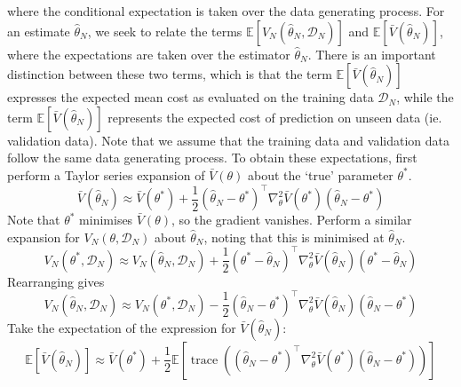 \documentclass[11pt]{report} %
\begin{document}
where the conditional expectation is taken over the data generating process. For an estimate $\hat{\theta}_{N}$, we seek to relate the terms $\mathbb{E}\left[V_{N}\left(\hat{\theta}_{N}, \mathcal{D}_{N}\right)\right]$ and $\mathbb{E}\left[\bar{V}\left(\hat{\theta}_{N}\right)\right]$, where the expectations are taken over the estimator $\hat{\theta}_{N}$. There is an important distinction between these two terms, which is that the term $\mathbb{E}\left[\bar{V}\left(\hat{\theta}_{N}\right)\right]$ expresses the expected mean cost as evaluated on the training data $\mathcal{D}_{N}$, while the term $\mathbb{E}\left[\bar{V}\left(\hat{\theta}_{N}\right)\right]$ represents the expected cost of prediction on unseen data (ie. validation data). Note that we assume that the training data and validation data follow the same data generating process. To obtain these expectations, first perform a Taylor series expansion of $\bar{V}\left(\theta\right)$ about the `true' parameter $\theta^{*}$.
\begin{equation}
\bar{V}\left(\hat{\theta}_{N}\right) \approx \bar{V}\left(\theta^{*}\right) + \dfrac{1}{2}\left(\hat{\theta}_{N} - \theta^{*}\right)^{\top}\nabla_{\theta}^{2}\bar{V}\left(\theta^{*}\right)\left(\hat{\theta}_{N} - \theta^{*}\right)
\end{equation}
Note that $\theta^{*}$ minimises $\bar{V}\left(\theta\right)$, so the gradient vanishes. Perform a similar expansion for $V_{N}\left(\theta, \mathcal{D}_{N}\right)$ about $\hat{\theta}_{N}$, noting that this is minimised at $\hat{\theta}_{N}$.
\begin{equation}
V_{N}\left(\theta^{*}, \mathcal{D}_{N}\right) \approx V_{N}\left(\hat{\theta}_{N}, \mathcal{D}_{N}\right) + \dfrac{1}{2}\left(\theta^{*} - \hat{\theta}_{N}\right)^{\top}\nabla_{\theta}^{2}\bar{V}\left(\hat{\theta}_{N}\right)\left(\theta^{*} - \hat{\theta}_{N}\right)
\end{equation}
Rearranging gives
\begin{equation}
V_{N}\left(\hat{\theta}_{N}, \mathcal{D}_{N}\right) \approx V_{N}\left(\theta^{*}, \mathcal{D}_{N}\right) - \dfrac{1}{2}\left(\hat{\theta}_{N} - \theta^{*}\right)^{\top}\nabla_{\theta}^{2}\bar{V}\left(\hat{\theta}_{N}\right)\left(\hat{\theta}_{N} - \theta^{*}\right)
\end{equation}
Take the expectation of the expression for $\bar{V}\left(\hat{\theta}_{N}\right)$:
\begin{equation}
\mathbb{E}\left[\bar{V}\left(\hat{\theta}_{N}\right)\right] \approx \bar{V}\left(\theta^{*}\right) + \dfrac{1}{2}\mathbb{E}\left[\operatorname{trace}\left(\left(\hat{\theta}_{N} - \theta^{*}\right)^{\top}\nabla_{\theta}^{2}\bar{V}\left(\theta^{*}\right)\left(\hat{\theta}_{N} - \theta^{*}\right)\right)\right]
\end{equation}
\end{document}
